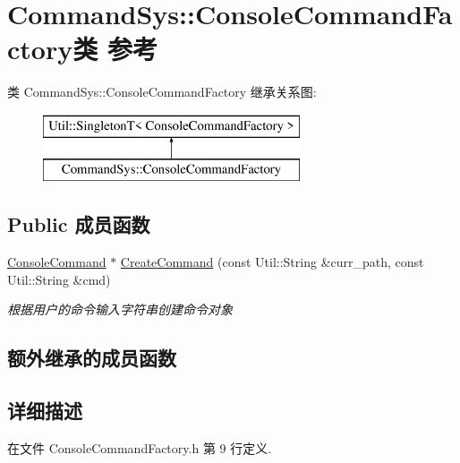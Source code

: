 \hypertarget{class_command_sys_1_1_console_command_factory}{\section{Command\-Sys\-:\-:Console\-Command\-Factory类 参考}
\label{class_command_sys_1_1_console_command_factory}
}
类 Command\-Sys\-:\-:Console\-Command\-Factory 继承关系图\-:\begin{figure}[H]
\begin{center}
\leavevmode
\includegraphics[height=2.000000cm]{class_command_sys_1_1_console_command_factory}
\end{center}
\end{figure}
\subsection*{Public 成员函数}
\begin{DoxyCompactItemize}
\item 
\hyperlink{class_command_sys_1_1_console_command}{Console\-Command} $\ast$ \hyperlink{class_command_sys_1_1_console_command_factory_a8f84a2b079f27ae225c0923f9b268d5c}{Create\-Command} (const Util\-::\-String \&curr\-\_\-path, const Util\-::\-String \&cmd)
\begin{DoxyCompactList}\small\item\em 根据用户的命令输入字符串创建命令对象 \end{DoxyCompactList}\end{DoxyCompactItemize}
\subsection*{额外继承的成员函数}


\subsection{详细描述}


在文件 Console\-Command\-Factory.\-h 第 9 行定义.




